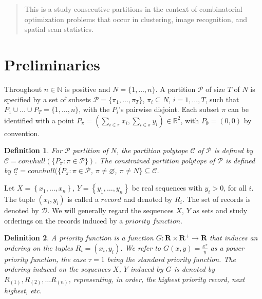 \documentclass{article}
\newtheorem{definition}{Definition}
\theoremstyle{case}
\begin{document}
\sloppy

\begin{abstract}
	This is a study consecutive partitions in the context of combinatorial optimization problems that occur in clustering, image recognition, and spatial scan statistics.
\end{abstract}

\section{Preliminaries}

Throughout $n \in \mathbb{N}$ is positive and $N = \{1, \dots, n\}$. A partition $\mathcal{P}$ of size $T$ of $N$ is specified by a set of subsets $\mathcal{P} = \{ \pi_1, \dots, \pi_T \}$, $\pi_i \subseteq N$, $i = 1, \dots, T$, such that $P_1 \cup \dots \cup P_T = \{1, \dots, n\}$, with the $P_i$'s pairwise disjoint. Each subset $\pi$ can be identified with a point $P_\pi = (\sum_{i \in \pi} x_i, \sum_{i \in \pi}y_i) \in \mathbb{R}^2$, with $P_{\emptyset} = (0,0)$ by convention.

\begin{definition}
For $\mathcal{P}$ partition of $N$, the partition polytope $\mathcal{C}$ of $\mathcal{P}$ is defined by $\mathcal{C} = convhull(\{P_\pi : \pi \in \mathcal{P}\})$. 
The constrained partition polytope of $\mathcal{P}$ is defined by $\underline{\mathcal{C}} = convhull(\{P_\pi : \pi \in \mathcal{P}$, $\pi \neq \varnothing$, $\pi \neq N\} \subseteq \mathcal{C}$. 
\end{definition}

Let $X = \left\lbrace x_1, \dots, x_n\right\rbrace$, $Y = \left\lbrace y_1, \dots, y_n\right\rbrace$ be real sequences with $y_i > 0$, for all $i$. The tuple $\left(x_i, y_i\right)$ is called a $\textit{record}$ and denoted by $R_i$. The set of records is denoted by $\mathcal{D}$. We will generally regard the sequences $X$, $Y$ as sets and study orderings on the records induced by a $\textit{priority function}$.

\begin{definition}
A priority function is a function $G\colon \mathbf{R} \times \mathbf{R}^{+} \to \mathbf{R}$ that induces an ordering on the tuples $R_i = \left(x_i, y_i\right)$. We refer to $G(x,y) = \frac{x^{\tau}}{y}$ as a power priority function, the case $\tau = 1$ being the standard priority function. The ordering induced on the sequences $X$, $Y$ induced by $G$ is denoted by $R_{(1)}, R_{(2)}, \dots R_{(n)}$, representing, in order, the highest priority record, next highest, etc. 
\end{definition}
\end{document}
